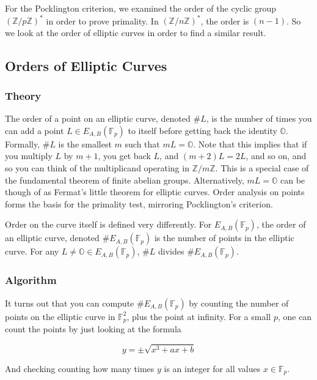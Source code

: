 \documentclass[]{article}
\newcommand{\Z}{\mathbb{Z}}
\newcommand{\OS}{\mathbb{O}}
\newcommand{\ZMZ}[1]{\Z/#1\Z}
\newcommand{\F}{\mathbb{F}}
\begin{document}
For the Pocklington criterion, we examined the order of the cyclic group $(\ZMZ{p})^*$ in order to prove primality. In $(\ZMZ{n})^*$, the order is $(n-1)$. So we look at the order of elliptic curves in order to find a similar result.

\subsection{Orders of Elliptic Curves}

\subsubsection{Theory}
The order of a point on an elliptic curve, denoted $\#L$, is the number of times you can add a point $L \in E_{A,B}(\F_p)$ to itself before getting back the identity $\OS$. Formally, $\#L$ is the smallest $m$ such that $mL = \OS$. Note that this implies that if you multiply $L$ by $m+1$, you get back $L$, and $(m+2)L = 2L$, and so on, and so you can think of the multiplicand operating in $\ZMZ{m}$. This is a special case of the fundamental theorem of finite abelian groups. Alternatively, $mL = \OS$ can be though of as Fermat's little theorem for elliptic curves. Order analysis on points forms the basis for the primality test, mirroring Pocklington's criterion.

Order on the curve itself is defined very differently.
For $E_{A,B}(\F_p)$, the order of an elliptic curve, denoted $\# E_{A,B}(\F_p)$ is the number of points in the elliptic curve. For any $L \ne \OS \in E_{A,B}(\F_p)$, $\# L$ divides $\# E_{A,B}(\F_p)$.

\subsubsection{Algorithm}

It turns out that you can compute $\# E_{A,B}(\F_p)$ by counting the number of points on the elliptic curve in $\F_p^2$, plus the point at infinity. For a small $p$, one can count the points by just looking at the formula

$$y=\pm \sqrt{x^3+ax+b}$$

And checking counting how many times $y$ is an integer for all values $x \in \F_p$.

\end{document}
